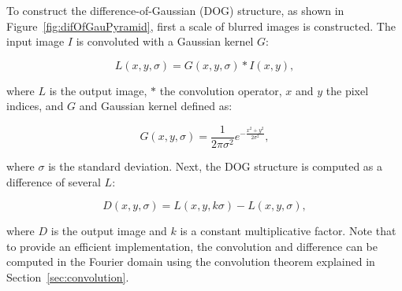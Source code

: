 \documentclass[12pt]{article}
\begin{document}
To construct the difference-of-Gaussian (DOG) structure, as shown in Figure~\ref{fig:difOfGauPyramid}, first a scale of blurred images is constructed.
The input image $I$ is convoluted with a Gaussian kernel $G$:

\begin{equation}
L(x,y,\sigma) = G(x,y,\sigma) * I(x,y),
\end{equation}

where $L$ is the output image, $*$ the convolution operator, $x$ and $y$ the pixel indices, and $G$ and Gaussian kernel defined as:

\begin{equation}
G(x,y,\sigma) = \frac{1}{2 \pi \sigma^2} e^{- \frac{x^2 + y^2}{2 \sigma^2}},
\end{equation}

where $\sigma$ is the standard deviation.
Next, the DOG structure is computed as a difference of several $L$:

\begin{equation}
D(x,y,\sigma) = L(x,y, k\sigma) - L(x,y, \sigma),
\end{equation}

where $D$ is the output image and $k$ is a constant multiplicative factor.
Note that to provide an efficient implementation, the convolution and difference can be computed in the Fourier domain using the convolution theorem explained in Section~\ref{sec:convolution}.
\end{document}
